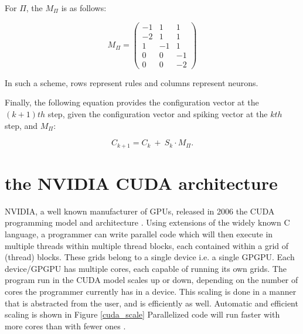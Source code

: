 \documentclass{acm_proc_article-sp}
\begin{document}
For $\Pi$, the $M_{\Pi}$ is as follows:

\begin{equation}\label{snp_mat}
M_{\Pi} = \left(
\begin{array}{ccc}
  -1 & 1 & 1\\
  -2 & 1 &  1 \\
   1 &  -1 & 1 \\
   0 & 0 & -1\\
   0 & 0& -2
\end{array}\right)
\end{equation}

In such a scheme, rows represent rules and columns
represent neurons.

Finally, the following equation provides the configuration
vector at the $(k+1)th$ step, given the configuration vector and
spiking vector at the $kth$ step, and $M_{\Pi}$:

\begin{equation}\label{next-config}
C_{k+1} =  C_{k} ~ + ~ S_{k}\cdot M_{\Pi}.
\end{equation}


\section{the NVIDIA CUDA architecture}

NVIDIA, a well known manufacturer of GPUs, released in
2006 the CUDA programming model and architecture \cite{cudapage}.
Using extensions of the widely known C language, a
programmer can write parallel code which will then execute
in multiple threads within multiple thread blocks, each
contained within a grid of (thread) blocks. These grids
belong to a single device i.e. a single GPGPU. Each
device/GPGPU has multiple cores, each capable of running
its own grids. The program run in the CUDA model scales
up or down, depending on the number of cores the
programmer currently has in a device. This scaling is done
in a manner that is abstracted from the user, and is
efficiently as well. Automatic and efficient scaling is shown
in Figure \ref{cuda_scale} Parallelized code will run faster with more cores
than with fewer ones \cite{cudaguide}.
\end{document}
